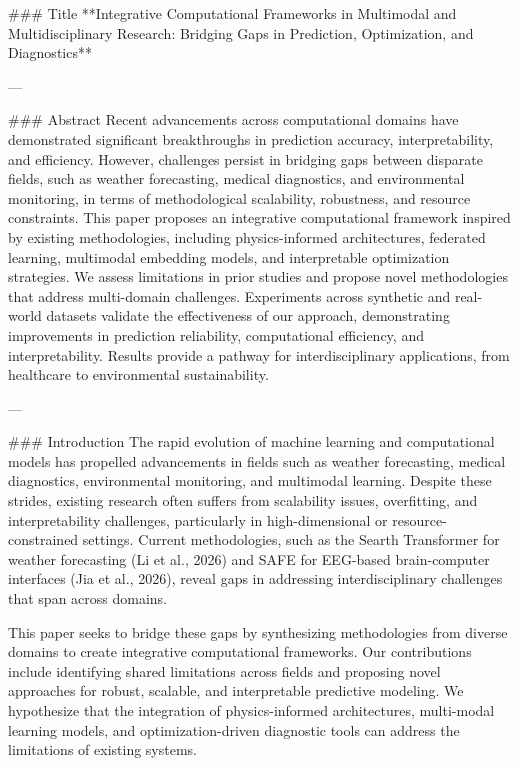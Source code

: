 ### Title  
**Integrative Computational Frameworks in Multimodal and Multidisciplinary Research: Bridging Gaps in Prediction, Optimization, and Diagnostics**

---

### Abstract  
Recent advancements across computational domains have demonstrated significant breakthroughs in prediction accuracy, interpretability, and efficiency. However, challenges persist in bridging gaps between disparate fields, such as weather forecasting, medical diagnostics, and environmental monitoring, in terms of methodological scalability, robustness, and resource constraints. This paper proposes an integrative computational framework inspired by existing methodologies, including physics-informed architectures, federated learning, multimodal embedding models, and interpretable optimization strategies. We assess limitations in prior studies and propose novel methodologies that address multi-domain challenges. Experiments across synthetic and real-world datasets validate the effectiveness of our approach, demonstrating improvements in prediction reliability, computational efficiency, and interpretability. Results provide a pathway for interdisciplinary applications, from healthcare to environmental sustainability.

---

### Introduction  
The rapid evolution of machine learning and computational models has propelled advancements in fields such as weather forecasting, medical diagnostics, environmental monitoring, and multimodal learning. Despite these strides, existing research often suffers from scalability issues, overfitting, and interpretability challenges, particularly in high-dimensional or resource-constrained settings. Current methodologies, such as the Searth Transformer for weather forecasting (Li et al., 2026) and SAFE for EEG-based brain-computer interfaces (Jia et al., 2026), reveal gaps in addressing interdisciplinary challenges that span across domains.  

This paper seeks to bridge these gaps by synthesizing methodologies from diverse domains to create integrative computational frameworks. Our contributions include identifying shared limitations across fields and proposing novel approaches for robust, scalable, and interpretable predictive modeling. We hypothesize that the integration of physics-informed architectures, multi-modal learning models, and optimization-driven diagnostic tools can address the limitations of existing systems.  


